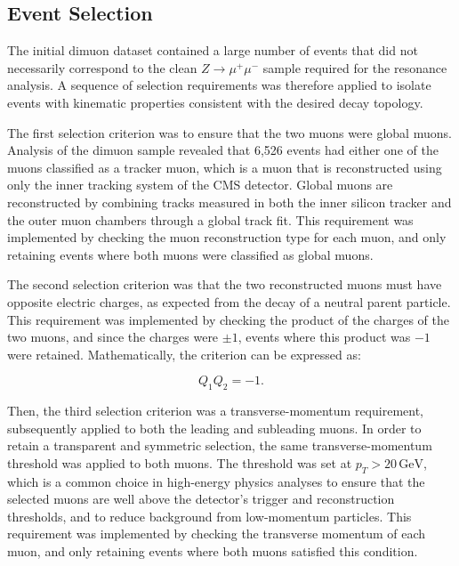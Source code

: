 \documentclass[11pt, a4paper]{article}
\numberwithin{equation}{section}
\begin{document}
\FloatBarrier
\FloatBarrier
\subsection{Event Selection}

The initial dimuon dataset contained a large number of events that did not necessarily correspond to the clean $Z\rightarrow\mu^+\mu^-$ sample required for the resonance analysis. A sequence of selection requirements was therefore applied to isolate events with kinematic properties consistent with the desired decay topology.

The first selection criterion was to ensure that the two muons were global muons. Analysis of the dimuon sample revealed that 6,526 events had either one of the muons classified as a tracker muon, which is a muon that is reconstructed using only the inner tracking system of the CMS detector. Global muons are reconstructed by combining tracks measured in both the inner silicon tracker and the outer muon chambers through a global track fit. This requirement was implemented by checking the muon reconstruction type for each muon, and only retaining events where both muons were classified as global muons.

The second selection criterion was that the two reconstructed muons must have opposite electric charges, as expected from the decay of a neutral parent particle. This requirement was implemented by checking the product of the charges of the two muons, and since the charges were $\pm 1$, events where this product was $-1$ were retained. Mathematically, the criterion can be expressed as:

\begin{equation} Q_1Q_2 = -1. \end{equation}

Then, the third selection criterion was a transverse-momentum requirement, subsequently applied to both the leading and subleading muons. In order to retain a transparent and symmetric selection, the same transverse-momentum threshold was applied to both muons. The threshold was set at $p_T > 20 \, \text{GeV}$, which is a common choice in high-energy physics analyses \cite{cms2019higgsww} to ensure that the selected muons are well above the detector's trigger and reconstruction thresholds, and to reduce background from low-momentum particles. This requirement was implemented by checking the transverse momentum of each muon, and only retaining events where both muons satisfied this condition.
\end{document}

